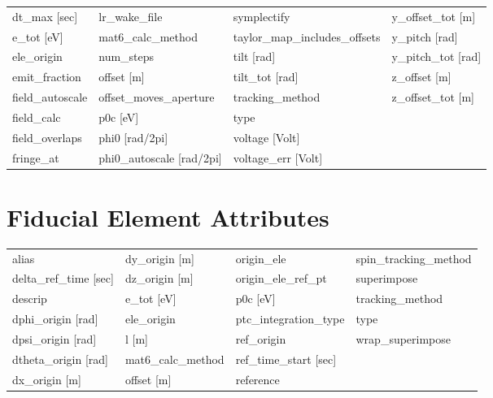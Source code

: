 \begin{tabular}{llll}
dt_max [sec]                     & lr_wake_file                     & symplectify                      & y_offset_tot [m]                 \\
e_tot [eV]                       & mat6_calc_method                 & taylor_map_includes_offsets      & y_pitch [rad]                    \\
ele_origin                       & num_steps                        & tilt [rad]                       & y_pitch_tot [rad]                \\
emit_fraction                    & offset [m]                       & tilt_tot [rad]                   & z_offset [m]                     \\
field_autoscale                  & offset_moves_aperture            & tracking_method                  & z_offset_tot [m]                 \\
field_calc                       & p0c [eV]                         & type                             &                                  \\
field_overlaps                   & phi0 [rad/2pi]                   & voltage [Volt]                   &                                  \\
fringe_at                        & phi0_autoscale [rad/2pi]         & voltage_err [Volt]               &                                  \\
 \bottomrule
 \end{tabular}
 \vfill
 
 \section{Fiducial Element Attributes}
 \label{s:list.fiducial}
 
 \begin{tabular}{llll} \toprule
alias                            & dy_origin [m]                    & origin_ele                       & spin_tracking_method             \\
delta_ref_time [sec]             & dz_origin [m]                    & origin_ele_ref_pt                & superimpose                      \\
descrip                          & e_tot [eV]                       & p0c [eV]                         & tracking_method                  \\
dphi_origin [rad]                & ele_origin                       & ptc_integration_type             & type                             \\
dpsi_origin [rad]                & l [m]                            & ref_origin                       & wrap_superimpose                 \\
dtheta_origin [rad]              & mat6_calc_method                 & ref_time_start [sec]             &                                  \\
dx_origin [m]                    & offset [m]                       & reference                        &                                  \\
 \bottomrule
 \end{tabular}
 \vfill
 

